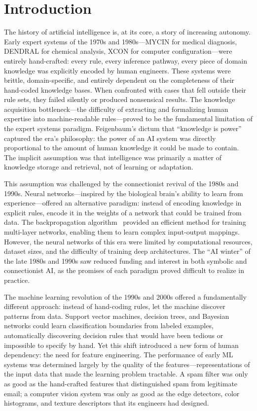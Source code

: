\section{Introduction}
\label{sec:intro}

The history of artificial intelligence is, at its core, a story of increasing autonomy. Early expert systems of the 1970s and 1980s---MYCIN for medical diagnosis, DENDRAL for chemical analysis, XCON for computer configuration---were entirely hand-crafted: every rule, every inference pathway, every piece of domain knowledge was explicitly encoded by human engineers. These systems were brittle, domain-specific, and entirely dependent on the completeness of their hand-coded knowledge bases. When confronted with cases that fell outside their rule sets, they failed silently or produced nonsensical results. The knowledge acquisition bottleneck---the difficulty of extracting and formalizing human expertise into machine-readable rules---proved to be the fundamental limitation of the expert systems paradigm. Feigenbaum's dictum that ``knowledge is power'' captured the era's philosophy: the power of an AI system was directly proportional to the amount of human knowledge it could be made to contain. The implicit assumption was that intelligence was primarily a matter of knowledge storage and retrieval, not of learning or adaptation.

This assumption was challenged by the connectionist revival of the 1980s and 1990s. Neural networks---inspired by the biological brain's ability to learn from experience---offered an alternative paradigm: instead of encoding knowledge in explicit rules, encode it in the weights of a network that could be trained from data. The backpropagation algorithm~\citep{rumelhart1986backprop} provided an efficient method for training multi-layer networks, enabling them to learn complex input-output mappings. However, the neural networks of this era were limited by computational resources, dataset sizes, and the difficulty of training deep architectures. The ``AI winter'' of the late 1980s and 1990s saw reduced funding and interest in both symbolic and connectionist AI, as the promises of each paradigm proved difficult to realize in practice.

The machine learning revolution of the 1990s and 2000s offered a fundamentally different approach: instead of hand-coding rules, let the machine discover patterns from data. Support vector machines, decision trees, and Bayesian networks could learn classification boundaries from labeled examples, automatically discovering decision rules that would have been tedious or impossible to specify by hand. Yet this shift introduced a new form of human dependency: the need for feature engineering. The performance of early ML systems was determined largely by the quality of the features---representations of the input data that made the learning problem tractable. A spam filter was only as good as the hand-crafted features that distinguished spam from legitimate email; a computer vision system was only as good as the edge detectors, color histograms, and texture descriptors that its engineers had designed.

